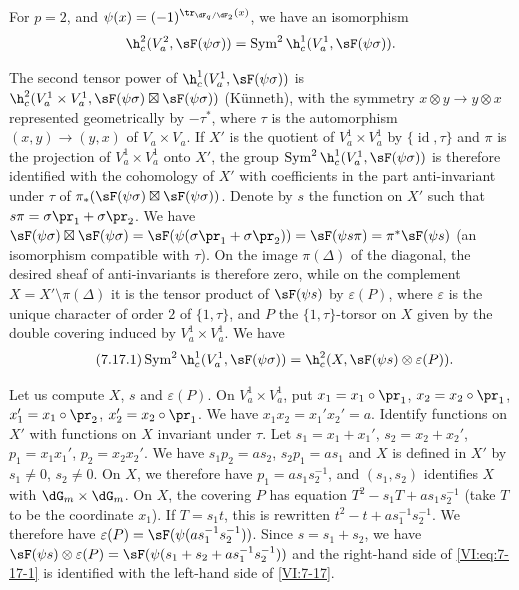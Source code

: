 \begin{proposition_}\label{VI:7-17}
For $p=2$, and $\psi(x)=(-1)^{\tr_{\dF_q/\dF_2}(x)}$, we have an isomorphism 
\[
  \h_c^2(V_a^2,\sF(\psi\sigma)) = \operatorname{Sym}^2 \h_c^1(V_a^1,\sF(\psi\sigma)) \text{.} 
\]
\end{proposition_}

The second tensor power of $\h_c^1(V_a^1,\sF(\psi\sigma))$ is 
$\h_c^2(V_a^1\times V_a^1,\sF(\psi\sigma)\boxtimes \sF(\psi\sigma))$ 
(K\"unneth), with the symmetry $x\otimes y\to y\otimes x$ represented 
geometrically by $-\tau^\ast$, where $\tau$ is the automorphism 
$(x,y)\to (y,x)$ of $V_a\times V_a$. If $X'$ is the quotient of 
$V_a^1\times V_a^1$ by $\{\operatorname{id}{},\tau\}$ and $\pi$ is the 
projection of $V_a^1\times V_a^1$ onto $X'$, the group 
$\operatorname{Sym}^2 \h_c^1(V_a^1,\sF(\psi\sigma))$ is therefore identified with the 
cohomology of $X'$ with coefficients in the part anti-invariant under $\tau$ of 
$\pi_\ast(\sF(\psi\sigma)\boxtimes \sF(\psi\sigma))$. Denote by $s$ the function 
on $X'$ such that $s\pi =\sigma\pr_1+\sigma\pr_2$. We have 
$\sF(\psi\sigma)\boxtimes \sF(\psi\sigma) = \sF(\psi(\sigma\pr_1+\sigma\pr_2)) = \sF(\psi s \pi) = \pi^\ast \sF(\psi s)$ 
(an isomorphism compatible with $\tau$). On the image $\pi(\Delta)$ of the 
diagonal, the desired sheaf of anti-invariants is therefore zero, while on 
the complement $X=X'\setminus \pi(\Delta)$ it is the tensor product of 
$\sF(\psi s)$ by $\varepsilon(P)$, where $\varepsilon$ is the unique character 
of order $2$ of $\{1,\tau\}$, and $P$ the $\{1,\tau\}$-torsor on $X$ given by the 
double covering induced by $V_a^1\times V_a^1$. We have 
\begin{equation*}\tag{7.17.1}\label{VI:eq:7-17-1}
  \operatorname{Sym}^2 \h_c^1(V_a^1,\sF(\psi\sigma)) = \h_c^2(X,\sF(\psi s)\otimes \varepsilon(P)) \text{.}
\end{equation*}

Let us compute $X$, $s$ and $\varepsilon(P)$. On $V_a^1\times V_a^1$, put 
$x_1=x_1\circ\pr_1$, $x_2=x_2\circ\pr_1$, $x_1'=x_1\circ \pr_2$, 
$x_2'=x_2\circ \pr_1$. We have $x_1 x_2=x_1'x_2'=a$. Identify functions on 
$X'$ with functions on $X$ invariant under $\tau$. Let $s_1=x_1+x_1'$, 
$s_2=x_2+x_2'$, $p_1=x_1 x_1'$, $p_2=x_2 x_2'$. We have $s_1 p_2 = a s_2$, 
$s_2 p_1 = a s_1$ and $X$ is defined in $X'$ by $s_1\ne 0$, $s_2\ne 0$. On 
$X$, we therefore have $p_1 = a s_1 s_2^{-1}$, and $(s_1,s_2)$ identifies $X$ with 
$\dG_m\times \dG_m$. On $X$, the covering $P$ has equation 
$T^2-s_1 T+a s_1 s_2^{-1}$ (take $T$ to be the coordinate $x_1$). If 
$T=s_1 t$, this is rewritten $t^2-t+a s_1^{-1} s_2^{-1}$. We therefore have 
$\varepsilon(P) = \sF(\psi(a s_1^{-1} s_2^{-1}))$. Since $s=s_1+s_2$, we have 
$\sF(\psi s)\otimes \varepsilon(P) = \sF(\psi(s_1+s_2+ a s_1^{-1} s_2^{-1}))$ 
and the right-hand side of \eqref{VI:eq:7-17-1} is identified with the left-hand side of 
\ref{VI:7-17}. 


